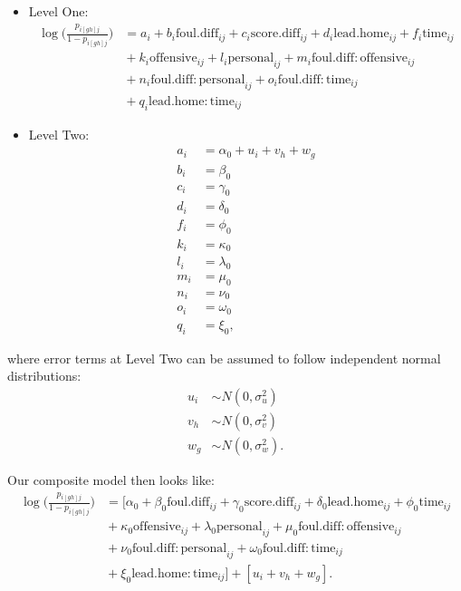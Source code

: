 \documentclass[
]{krantz}
\providecommand{\tightlist}{%
  \setlength{\itemsep}{0pt}\setlength{\parskip}{0pt}}
\begin{document}
\begin{itemize}
\tightlist
\item
  Level One:
  \begin{align*}
  \log\bigg(\frac{p_{i[gh]j}}{1-p_{i[gh]j}}\bigg) & = a_{i} + b_{i}\mathrm{foul.diff}_{ij} + c_{i}\mathrm{score.diff}_{ij} + d_{i}\mathrm{lead.home}_{ij} + f_{i}\mathrm{time}_{ij} \\
   &{} + k_{i}\mathrm{offensive}_{ij} + l_{i}\mathrm{personal}_{ij} + m_{i}\mathrm{foul.diff:offensive}_{ij} \\
   &{} + n_{i}\mathrm{foul.diff:personal}_{ij} + o_{i}\mathrm{foul.diff:time}_{ij} \\
   &{} + q_{i}\mathrm{lead.home:time}_{ij}
  \end{align*}
\item
  Level Two:
  \begin{align*}
  a_{i} & = \alpha_{0}+u_{i}+v_{h}+w_{g} \\
  b_{i} & = \beta_{0} \\
  c_{i} & = \gamma_{0} \\
  d_{i} & = \delta_{0} \\
  f_{i} & = \phi_{0} \\
  k_{i} & = \kappa_{0} \\
  l_{i} & = \lambda_{0} \\
  m_{i} & = \mu_{0} \\
  n_{i} & = \nu_{0} \\
  o_{i} & = \omega_{0} \\
  q_{i} & = \xi_{0},
  \end{align*}
\end{itemize}

where error terms at Level Two can be assumed to follow independent normal distributions:
\begin{align*}
u_{i} & \sim N \left( 0 , \sigma_{u}^{2} \right) \\
v_{h} & \sim N \left( 0 , \sigma_{v}^{2} \right) \\
w_{g} & \sim N \left( 0 , \sigma_{w}^{2} \right).
\end{align*}

Our composite model then looks like:
\begin{align*}
\log\bigg(\frac{p_{i[gh]j}}{1-p_{i[gh]j}}\bigg) & = [\alpha_{0} + \beta_{0}\mathrm{foul.diff}_{ij} + \gamma_{0}\mathrm{score.diff}_{ij} + \delta_{0}\mathrm{lead.home}_{ij} + \phi_{0}\mathrm{time}_{ij} \\
 &{} + \kappa_{0}\mathrm{offensive}_{ij} + \lambda_{0}\mathrm{personal}_{ij} + \mu_{0}\mathrm{foul.diff:offensive}_{ij} \\
 &{} + \nu_{0}\mathrm{foul.diff:personal}_{ij} + \omega_{0}\mathrm{foul.diff:time}_{ij} \\
 &{} + \xi_{0}\mathrm{lead.home:time}_{ij}] + [u_{i}+v_{h}+w_{g}].
\end{align*}
\end{document}
